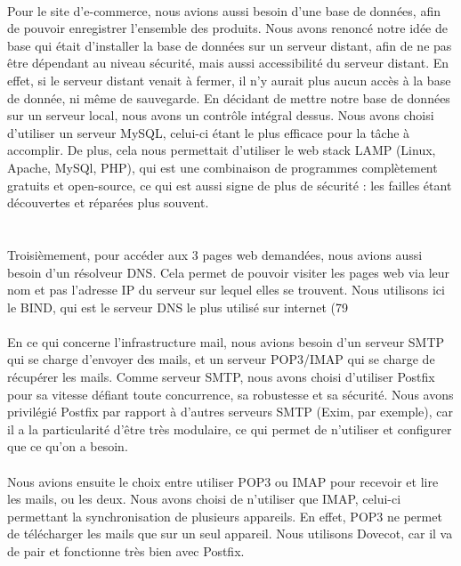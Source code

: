 \documentclass[a4paper,12pt]{article}
\begin{document}
	\paragraph{} Pour le site d’e-commerce, nous avions aussi besoin d’une base de données, afin de
pouvoir enregistrer l’ensemble des produits. Nous avons renoncé notre idée de base
qui était d’installer la base de données sur un serveur distant, afin de ne pas être
dépendant au niveau sécurité, mais aussi accessibilité du serveur distant. En effet, si
le serveur distant venait à fermer, il n’y aurait plus aucun accès à la base de donnée,
ni même de sauvegarde. En décidant de mettre notre base de données sur un serveur
local, nous avons un contrôle intégral dessus. Nous avons choisi d’utiliser un serveur
MySQL, celui-ci étant le plus efficace pour la tâche à accomplir. De plus, cela nous
permettait d’utiliser le web stack LAMP (Linux, Apache, MySQl, PHP), qui est une
combinaison de programmes complètement gratuits et open-source, ce qui est aussi
signe de plus de sécurité : les failles étant découvertes et réparées plus souvent.
\\
\\
	\paragraph{} Troisièmement, pour accéder aux 3 pages web demandées, nous avions aussi besoin
d’un résolveur DNS. Cela permet de pouvoir visiter les pages web via leur nom et
pas l’adresse IP du serveur sur lequel elles se trouvent. Nous utilisons ici le BIND,
qui est le serveur DNS le plus utilisé sur internet (79%
	\paragraph{} En ce qui concerne l’infrastructure mail, nous avions besoin d’un serveur SMTP
qui se charge d’envoyer des mails, et un serveur POP3/IMAP qui se charge de récupérer
les mails. Comme serveur SMTP, nous avons choisi d’utiliser Postfix pour
sa vitesse défiant toute concurrence, sa robustesse et sa sécurité. Nous avons privilégié
Postfix par rapport à d’autres serveurs SMTP (Exim, par exemple), car il a la
particularité d’être très modulaire, ce qui permet de n’utiliser et configurer que ce
qu’on a besoin.
	\paragraph{} Nous avions ensuite le choix entre utiliser POP3 ou IMAP pour recevoir et lire les
mails, ou les deux. Nous avons choisi de n’utiliser que IMAP, celui-ci permettant la
synchronisation de plusieurs appareils. En effet, POP3 ne permet de télécharger les
mails que sur un seul appareil. Nous utilisons Dovecot, car il va de pair et fonctionne
très bien avec Postfix.
\end{document}
